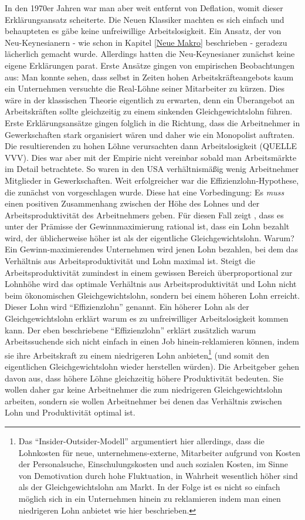 In den 1970er Jahren war man aber weit entfernt von Deflation, womit dieser Erklärungsansatz scheiterte. Die Neuen Klassiker machten es sich einfach und behaupteten es gäbe keine unfreiwillige Arbeitslosigkeit. Ein Ansatz, der von Neu-Keynesianern - wie schon in Kapitel \ref{Neue Makro} beschrieben - geradezu lächerlich gemacht wurde. Allerdings hatten die Neu-Keynesianer zunächst keine eigene Erklärungen parat. Erste Ansätze gingen von empirischen Beobachtungen aus: Man konnte sehen, dass selbst in Zeiten hohen Arbeitskräfteangebots kaum ein Unternehmen versuchte die Real-Löhne seiner Mitarbeiter zu kürzen. Dies wäre in der klassischen Theorie eigentlich zu erwarten, denn ein Überangebot an Arbeitskräften sollte gleichzeitig zu einem sinkenden Gleichgewichtslohn führen. Erste Erklärungsansätze gingen folglich in die Richtung, dass die Arbeitnehmer in Gewerkschaften stark organisiert wären und daher wie ein Monopolist auftraten. Die resultierenden zu hohen Löhne verursachten dann Arbeitslosigkeit (QUELLE VVV). Dies war aber mit der Empirie nicht vereinbar sobald man Arbeitsmärkte im Detail betrachtete. So waren in den USA verhältnismäßig wenig Arbeitnehmer Mitglieder in Gewerkschaften.
Weit erfolgreicher war die Effizienzlohn-Hypothese, die zunächst von \textcite{Stiglitz1976b} vorgeschlagen wurde. Diese hat eine Vorbedingung: Es \textit{muss} einen positiven Zusammenhang zwischen der Höhe des Lohnes und der Arbeitsproduktivität des Arbeitnehmers geben. Für diesen Fall zeigt \textcite{Stiglitz1976b}, dass es unter der Prämisse der Gewinnmaximierung rational ist, dass ein Lohn bezahlt wird, der üblicherweise höher ist als der eigentliche Gleichgewichtslohn. Warum? Ein Gewinn-maximierendes Unternehmen wird jenen Lohn bezahlen, bei dem das Verhältnis aus Arbeitsproduktivität und Lohn maximal ist. Steigt die Arbeitsproduktivität zumindest in einem gewissen Bereich überproportional zur Lohnhöhe wird das optimale Verhältnis aus Arbeitsproduktivität und Lohn nicht beim ökonomischen Gleichgewichtslohn, sondern bei einem höheren Lohn erreicht. Dieser Lohn wird "`Effizienzlohn"' genannt.
Ein höherer Lohn als der Gleichgewichtslohn erklärt warum es zu unfreiwilliger Arbeitslosigkeit kommen kann. Der eben beschriebene "`Effizienzlohn"' erklärt zusätzlich warum Arbeitssuchende sich nicht einfach in einen Job hinein-reklamieren können, indem sie ihre Arbeitskraft zu einem niedrigeren Lohn anbieten\footnote{Das "`Insider-Outsider-Modell"' argumentiert hier allerdings, dass die Lohnkosten für neue, unternehmens-externe, Mitarbeiter aufgrund von Kosten der Personalsuche, Einschulungskosten und auch sozialen Kosten, im Sinne von Demotivation durch hohe Fluktuation, in Wahrheit wesentlich höher sind als der Gleichgewichtslohn am Markt. In der Folge ist es nicht so einfach möglich sich in ein Unternehmen hinein zu reklamieren indem man einen niedrigeren Lohn anbietet wie hier beschrieben.} (und somit den eigentlichen Gleichgewichtslohn wieder herstellen würden). Die Arbeitgeber gehen davon aus, dass höhere Löhne gleichzeitig höhere Produktivität bedeuten. Sie wollen daher gar keine Arbeitnehmer die zum niedrigeren Gleichgewichtslohn arbeiten, sondern sie wollen Arbeitnehmer bei denen das Verhältnis zwischen Lohn und Produktivität optimal ist. 
 
